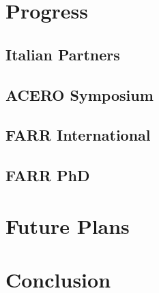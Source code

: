 \documentclass[bsc]{abdnthesis}
\begin{document}


\chapter{Progress}
\section{Italian Partners} %
\label{sec:italian_partners}

\section{ACERO Symposium} %
\label{sec:acero_symposium}

\section{FARR International} %
\label{sec:farr_international}

\section{FARR PhD} %
\label{sec:farr_phd}



\chapter{Future Plans}


\chapter{Conclusion}







\end{document}
